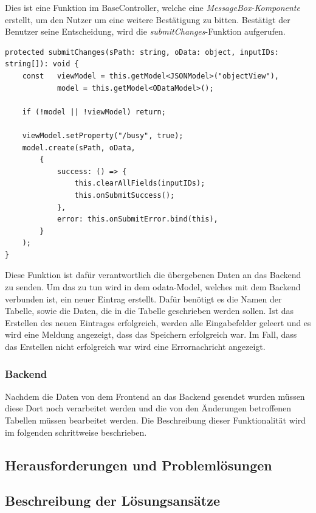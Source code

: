 Dies ist eine Funktion im BaseController, welche eine \textit{MessageBox-Komponente} erstellt, um den Nutzer um eine weitere Bestätigung zu bitten.
Bestätigt der Benutzer seine Entscheidung, wird die \textit{submitChanges}-Funktion aufgerufen.

\begin{lstlisting}[caption={submitChanges Funktion}]
protected submitChanges(sPath: string, oData: object, inputIDs: string[]): void {
    const   viewModel = this.getModel<JSONModel>("objectView"),
            model = this.getModel<ODataModel>();

    if (!model || !viewModel) return;

    viewModel.setProperty("/busy", true);
    model.create(sPath, oData,
        {
            success: () => {
                this.clearAllFields(inputIDs);
                this.onSubmitSuccess();
            },
            error: this.onSubmitError.bind(this),
        }
    );
} 
\end{lstlisting}

Diese Funktion ist dafür verantwortlich die übergebenen Daten an das Backend zu senden.
Um das zu tun wird in dem \gls{odata}-Model, welches mit dem Backend verbunden ist, ein neuer Eintrag erstellt.
Dafür benötigt es die Namen der Tabelle, sowie die Daten, die in die Tabelle geschrieben werden sollen.
Ist das Erstellen des neuen Eintrages erfolgreich, werden alle Eingabefelder geleert und es wird eine Meldung angezeigt, dass das Speichern erfolgreich war.
Im Fall, dass das Erstellen nicht erfolgreich war wird eine Errornachricht angezeigt.

\subsubsection[Backend]{Backend}

Nachdem die Daten von dem Frontend an das Backend gesendet wurden müssen diese Dort noch verarbeitet werden und die von den Änderungen betroffenen Tabellen müssen bearbeitet werden.
Die Beschreibung dieser Funktionalität wird im folgenden schrittweise beschrieben.




\subsection[Herausforderungen und Problemlösungen]{Herausforderungen und Problemlösungen}

\subsection[Beschreibung der Lösungsansätze]{Beschreibung der Lösungsansätze}
